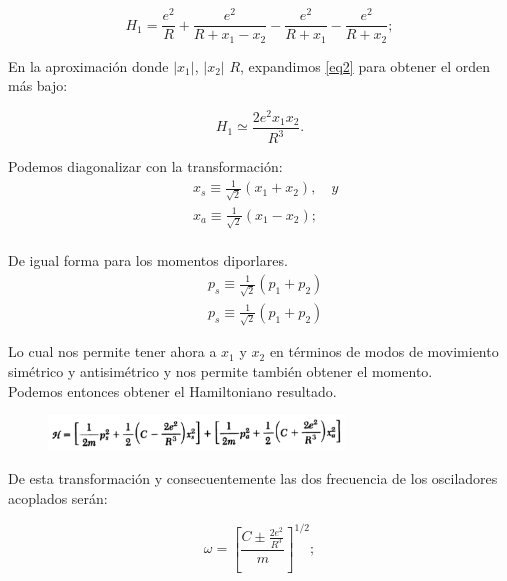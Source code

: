 \documentclass{article}
\providecommand{\abs}[1]{\lvert#1\rvert} %
\begin{document}
\begin{equation}
    H_{1} =\frac{e^{2}}{R}+\frac{e^{2}}{R+x_{1}-x_{2}}-\frac{e^{2}}{R+x_{1}}-\frac{e^{2}}{R+x_{2}};
    \label{eq2}
\end{equation}

En la aproximación donde $\abs{x_{1}}$, $\abs{x_{2}}$  $R$, expandimos \ref{eq2} para obtener el orden más bajo:

\begin{equation}
    H_{1} \simeq \frac{2e^{2}x_{1}x_{2}}{R^{3}}.
    \label{eq3}
\end{equation}{}

Podemos diagonalizar con la transformación:
\begin{equation}
\begin{split}
&x_{s} \equiv \frac{1}{\sqrt{2}}(x_{1}+x_{2}) , \quad y \\
&x_{a} \equiv \frac{1}{\sqrt{2}}(x_{1}-x_{2}); \\
\end{split}
    \label{eq87687575}
\end{equation}

De igual forma para los momentos diporlares.
\begin{equation}
\begin{split}
    &p_{s} \equiv \frac{1}{\sqrt{2}}(p_{1}+p_{2})\\
    &p_{s} \equiv \frac{1}{\sqrt{2}}(p_{1}+p_{2})
 \end{split}  
\end{equation}{}


Lo cual nos permite tener ahora a $x_{1}$ y $x_{2}$ en términos de modos de movimiento simétrico y antisimétrico y nos permite también obtener el momento. \\
Podemos entonces obtener el Hamiltoniano resultado.\\

\begin{figure}[h]
    \centering
    \includegraphics[width=0.7\textwidth]{a4.png}
    \label{Figura 1}
\end{figure}

De esta transformación y consecuentemente las dos frecuencia de los osciladores acoplados serán:

\begin{equation}
    \omega = \left[\frac{C \pm \frac{2e^{2}}{R^{3}}}{m}\right]^{1/2};
        \label{eq4}
\end{equation}\\
\end{document}
